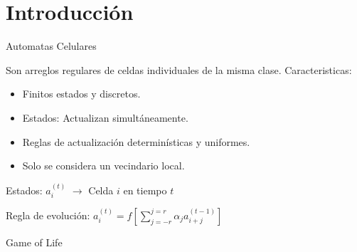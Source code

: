 \section{Introducción}

\begin{frame}{Automatas Celulares}
    \begin{block}{Son arreglos regulares de celdas individuales de la misma clase.}
        Caracteristicas:
        \begin{itemize}
            \item Finitos estados y discretos.
            \item Estados: Actualizan simultáneamente.
            \item Reglas de actualización determinísticas y uniformes.
            \item Solo se considera un vecindario local.
        \end{itemize}
    \end{block}

    \begin{multicols}{2}
        {Estados: $a_{i}^{(t)}$ $\rightarrow$ Celda $i$ en tiempo $t$}

        {Regla de evolución: $a_{i}^{(t)} = f \left[ \sum_{j=-r}^{j=r}  \alpha_{j} a_{i+j}^{(t-1)} \right]$}
    \end{multicols}

\end{frame}

\begin{frame}{Game of Life}

\end{frame}

